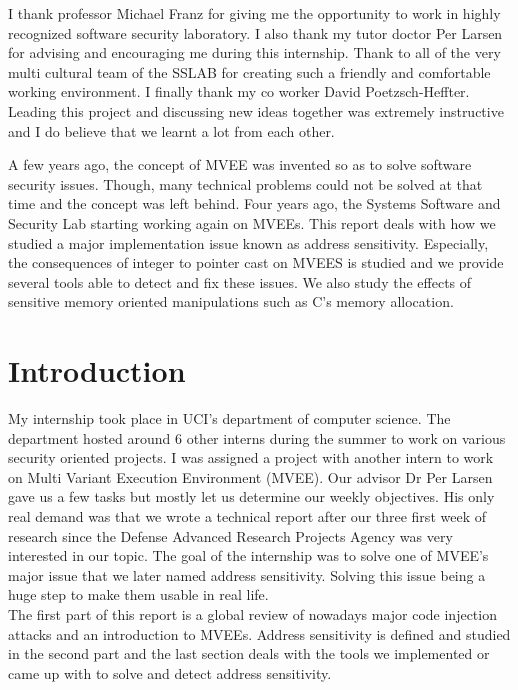 \documentclass[english]{enstaPRE}
\begin{document}
\couverture






I thank professor Michael Franz for giving me the opportunity to work in highly recognized software security laboratory.
I also thank my tutor doctor Per Larsen for advising and encouraging me during this internship.
Thank to all of the very multi cultural team of the SSLAB for creating such a friendly and comfortable working environment.
I finally thank my co worker David Poetzsch-Heffter. Leading this project and discussing new ideas together was extremely 
instructive and I do believe that we learnt a lot from each other.


A few years ago, the concept of MVEE was invented so as to solve software security issues. 
Though, many technical problems could not be solved at that time and the concept was left behind.
Four years ago, the Systems Software and Security Lab starting working again on MVEEs.
This report deals with how we studied a major implementation issue known as address sensitivity.
Especially, the consequences of integer to pointer cast on MVEES is studied and we provide several tools able to detect and fix 
these issues. We also study the effects of sensitive memory oriented manipulations such as C's memory allocation.
\tableofcontents

\part{Introduction}

My internship took place in UCI's department of computer science. The department hosted around 6 other interns during the summer to 
work on various security oriented projects. I was assigned a project with another intern to work on Multi Variant Execution 
Environment (MVEE). Our advisor Dr Per Larsen gave us a few tasks but mostly let us determine our weekly objectives.
His only real demand was that we wrote a technical report after our three first week of research since the Defense Advanced
Research Projects Agency was very interested in our topic.
The goal of the internship was to solve one of MVEE's major issue that we later named address sensitivity. Solving this issue being
a huge step to make them usable in real life. \\
The first part of this report is a global review of nowadays major code injection attacks and an introduction to MVEEs.
Address sensitivity is defined and studied in the second part and the last section deals with the tools we implemented 
or came up with to solve and detect address sensitivity.
\end{document}
